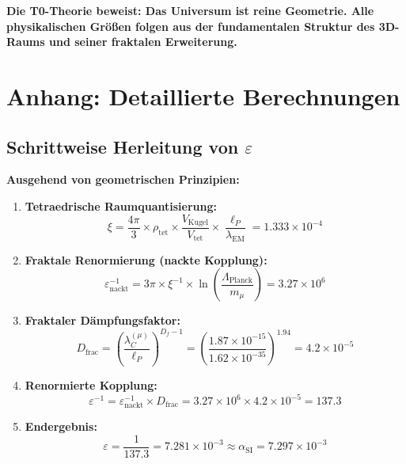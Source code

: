 \documentclass[12pt,a4paper]{article}
\numberwithin{equation}{section}
\newcommand{\xipar}{\xi}
\newcommand{\epsilonT}{\varepsilon}
\newcommand{\alphaSI}{\alpha_{\text{SI}}}
\newcommand{\Df}{D_f}
\newcommand{\lP}{\ell_P}
\newcommand{\lambdaC}{\lambda_C}
\newcommand{\lambdaEM}{\lambda_{\text{EM}}}
\begin{document}
	\textbf{Die T0-Theorie beweist: Das Universum ist reine Geometrie. Alle physikalischen Größen folgen aus der fundamentalen Struktur des 3D-Raums und seiner fraktalen Erweiterung.}
	
	\section{Anhang: Detaillierte Berechnungen}
	
	\subsection{Schrittweise Herleitung von $\epsilonT$}
	
	\textbf{Ausgehend von geometrischen Prinzipien:}
	
	\begin{enumerate}
		\item \textbf{Tetraedrische Raumquantisierung:}
		\begin{equation}
			\xipar = \frac{4\pi}{3} \times \rho_{\text{tet}} \times \frac{V_{\text{Kugel}}}{V_{\text{tet}}} \times \frac{\lP}{\lambdaEM} = 1.333 \times 10^{-4}
			\label{eq:xi_step1}
		\end{equation}
		
		\item \textbf{Fraktale Renormierung (nackte Kopplung):}
		\begin{equation}
			\epsilonT^{-1}_{\text{nackt}} = 3\pi \times \xipar^{-1} \times \ln\left(\frac{\Lambda_{\text{Planck}}}{m_\mu}\right) = 3.27 \times 10^6
			\label{eq:epsilon_step2}
		\end{equation}
		
		\item \textbf{Fraktaler Dämpfungsfaktor:}
		\begin{equation}
			D_{\text{frac}} = \left(\frac{\lambdaC^{(\mu)}}{\lP}\right)^{\Df-1} = \left(\frac{1.87 \times 10^{-15}}{1.62 \times 10^{-35}}\right)^{1.94} = 4.2 \times 10^{-5}
			\label{eq:epsilon_step3}
		\end{equation}
		
		\item \textbf{Renormierte Kopplung:}
		\begin{equation}
			\epsilonT^{-1} = \epsilonT^{-1}_{\text{nackt}} \times D_{\text{frac}} = 3.27 \times 10^6 \times 4.2 \times 10^{-5} = 137.3
			\label{eq:epsilon_step4}
		\end{equation}
		
		\item \textbf{Endergebnis:}
		\begin{equation}
			\epsilonT = \frac{1}{137.3} = 7.281 \times 10^{-3} \approx \alphaSI = 7.297 \times 10^{-3}
			\label{eq:epsilon_step5}
		\end{equation}
	\end{enumerate}
	
\end{document}
